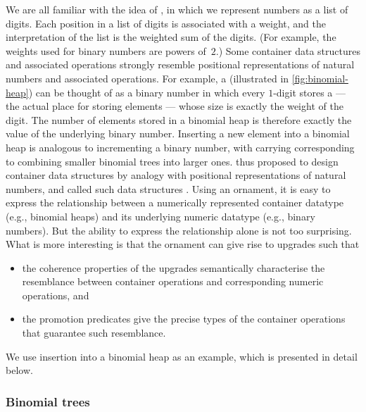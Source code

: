 We are all familiar with the idea of , in which we represent numbers as a list of digits.
Each position in a list of digits is associated with a weight, and the interpretation of the list is the weighted sum of the digits.
(For example, the weights used for binary numbers are powers of~$2$.)
Some container data structures and associated operations strongly resemble positional representations of natural numbers and associated operations.
For example, a  (illustrated in \autoref{fig:binomial-heap}) can be thought of as a binary number in which every $1$-digit stores a  --- the actual place for storing elements --- whose size is exactly the weight of the digit.
The number of elements stored in a binomial heap is therefore exactly the value of the underlying binary number.
Inserting a new element into a binomial heap is analogous to incrementing a binary number, with carrying corresponding to combining smaller binomial trees into larger ones.
\citeauthor{Okasaki-data-structures} thus proposed to design container data structures by analogy with positional representations of natural numbers, and called such data structures .
Using an ornament, it is easy to express the relationship between a numerically represented container datatype (e.g., binomial heaps) and its underlying numeric datatype (e.g., binary numbers).
But the ability to express the relationship alone is not too surprising.
What is more interesting is that the ornament can give rise to upgrades such that
\begin{itemize}
\item the coherence properties of the upgrades semantically characterise the resemblance between container operations and corresponding numeric operations, and
\item the promotion predicates give the precise types of the container operations that guarantee such resemblance.
\end{itemize}
We use insertion into a binomial heap as an example, which is presented in detail below.

\subsubsection{Binomial trees}

